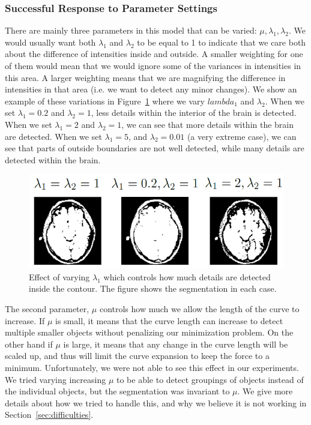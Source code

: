 \documentclass[10pt,twocolumn,letterpaper]{article}
\begin{document}
\subsubsection*{Successful Response to Parameter Settings}

There are mainly three parameters in this model that can be varied: $\mu, \lambda_{1}, \lambda_{2}$. We would usually want both $\lambda_{1}$ and $\lambda_{2}$
to be equal to 1 to indicate that we care both about the difference of intensities inside and outside. A smaller weighting for one of them would mean that we
would ignore some of the variances in intensities in this area. A larger weighting means that we are magnifying the difference in intensities in that area
(i.e. we want to detect any minor changes). We show an example of these variations in Figure~\ref{fig:cv_eg12} where we vary
$lambda_1$ and $\lambda_2$. When we set $\lambda_1 = 0.2$ and $\lambda_2 = 1$, less details within the interior of the brain is detected. When
we set $\lambda_1 = 2$ and $\lambda_2 = 1$, we can see that more details within the brain are detected. When we set $\lambda_1 = 5$, and $\lambda_2 = 0.01$ (a
very extreme case), we can see that parts of outside boundaries are not well detected, while many details are detected within the brain.

\begin{figure}[t]
\centering
\includegraphics[width=12cm]{cv_eg12.png}
\caption{Effect of varying $\lambda_1$ which controls how much details are detected inside the contour. The figure shows the segmentation in each case.}
\label{fig:cv_eg12}
\end{figure}

The second parameter, $\mu$ controls how much we allow the length of the curve to increase. If $\mu$ is small, it means that the curve length can increase to
detect multiple smaller objects without penalizing our minimization problem. On the other hand if $\mu$ is large, it means that any change in the curve length
will be scaled up, and thus will limit the curve expansion to keep the force to a minimum. Unfortunately, we were not able to see this effect in our
experiments. We tried varying increasing $\mu$ to be able to detect groupings of objects instead of the individual objects, but the segmentation was invariant
to $\mu$. We give more details about how we tried to handle this, and why we believe it is not working in Section~\ref{sec:difficulties}.
\end{document}
